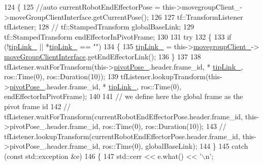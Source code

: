 \begin{DoxyCode}
124     \{
125         \textcolor{comment}{//auto currentRobotEndEffectorPose =
       this->movegroupClient\_->moveGroupClientInterface.getCurrentPose();}
126 
127         tf::TransformListener tfListener;
128         \textcolor{comment}{// tf::StampedTransform globalBaseLink;}
129         tf::StampedTransform endEffectorInPivotFrame;
130 
131         \textcolor{keywordflow}{try}
132         \{
133             \textcolor{keywordflow}{if} (!\hyperlink{classcl__move__group__interface_1_1CbMoveEndEffectorTrajectory_a24c6c30b9b0761a61fa002d947bd3e11}{tipLink\_} || *\hyperlink{classcl__move__group__interface_1_1CbMoveEndEffectorTrajectory_a24c6c30b9b0761a61fa002d947bd3e11}{tipLink\_} == \textcolor{stringliteral}{""})
134             \{
135                 \hyperlink{classcl__move__group__interface_1_1CbMoveEndEffectorTrajectory_a24c6c30b9b0761a61fa002d947bd3e11}{tipLink\_} = this->\hyperlink{classcl__move__group__interface_1_1CbMoveEndEffectorTrajectory_aea650d3e7836125b32be97392b71a7f3}{movegroupClient\_}->
      \hyperlink{classcl__move__group__interface_1_1ClMoveGroup_a92922ea689e4e1b7b91512c56629c95b}{moveGroupClientInterface}.getEndEffectorLink();
136             \}
137 
138             tfListener.waitForTransform(this->\hyperlink{classcl__move__group__interface_1_1CbCircularPouringMotion_a58ce9c29e4ef8f09a7569d6d8f9df56b}{pivotPose\_}.header.frame\_id, *
      \hyperlink{classcl__move__group__interface_1_1CbMoveEndEffectorTrajectory_a24c6c30b9b0761a61fa002d947bd3e11}{tipLink\_}, ros::Time(0), ros::Duration(10));
139             tfListener.lookupTransform(this->\hyperlink{classcl__move__group__interface_1_1CbCircularPouringMotion_a58ce9c29e4ef8f09a7569d6d8f9df56b}{pivotPose\_}.header.frame\_id, *
      \hyperlink{classcl__move__group__interface_1_1CbMoveEndEffectorTrajectory_a24c6c30b9b0761a61fa002d947bd3e11}{tipLink\_}, ros::Time(0), endEffectorInPivotFrame);
140 
141             \textcolor{comment}{// we define here the global frame as the pivot frame id}
142             \textcolor{comment}{// tfListener.waitForTransform(currentRobotEndEffectorPose.header.frame\_id,
       this->pivotPose\_.header.frame\_id, ros::Time(0), ros::Duration(10));}
143             \textcolor{comment}{// tfListener.lookupTransform(currentRobotEndEffectorPose.header.frame\_id,
       this->pivotPose\_.header.frame\_id, ros::Time(0), globalBaseLink);}
144         \}
145         \textcolor{keywordflow}{catch} (\textcolor{keyword}{const} std::exception &e)
146         \{
147             std::cerr << e.what() << \textcolor{charliteral}{'\(\backslash\)n'};

\end{DoxyCode}
